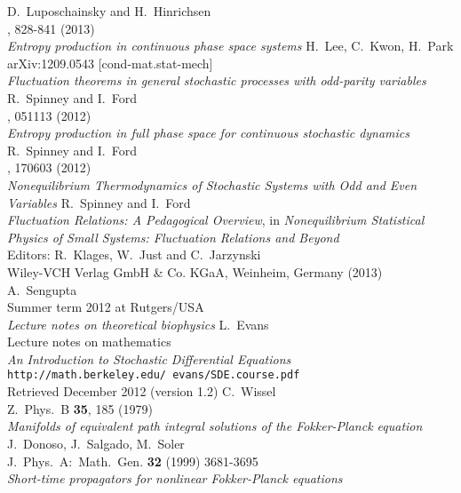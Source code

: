\begin{thebibliography}{99}
		
	 {
		D.~Luposchainsky and H.~Hinrichsen \\
		, 828-841 (2013) \\
		\emph{Entropy production in continuous phase space systems}
		}
	 {
		H.~Lee, C.~Kwon, H.~Park \\
		arXiv:1209.0543 [cond-mat.stat-mech] \\
		\emph{Fluctuation theorems in general stochastic processes with odd-parity variables}
		}
	 {
		R.~Spinney and I.~Ford \\
		, 051113 (2012) \\
		\emph{Entropy production in full phase space for continuous stochastic dynamics}
		}
	 {
		R.~Spinney and I.~Ford \\
		, 170603 (2012) \\
		\emph{Nonequilibrium Thermodynamics of Stochastic Systems with Odd and Even Variables}
		}
	 {
		R.~Spinney and I.~Ford \\
		\emph{Fluctuation Relations: A Pedagogical Overview}, in \emph{Nonequilibrium Statistical Physics of Small Systems: Fluctuation Relations and Beyond} \\
		Editors: R.~Klages, W.~Just and C.~Jarzynski \\
		Wiley-VCH Verlag GmbH \& Co. KGaA, Weinheim, Germany (2013)
		}
	 {
		A.~Sengupta \\
		Summer term 2012 at Rutgers/USA \\
		\emph{Lecture notes on theoretical biophysics}
		}
	 {
		L.~Evans \\
		Lecture notes on mathematics \\
		\emph{An Introduction to Stochastic Differential Equations} \\
		\texttt{http://math.berkeley.edu/~evans/SDE.course.pdf} \\
		Retrieved December 2012 (version 1.2)
		}
	 {
		C.~Wissel \\
		Z.~Phys.~B \textbf{35}, 185 (1979) \\
		\emph{Manifolds of equivalent path integral solutions of the Fokker-Planck equation}
		}
	 {
		J.~Donoso, J.~Salgado, M.~Soler \\
		J.~Phys.~A:~Math.~Gen. \textbf{32} (1999) 3681-3695 \\
		\emph{Short-time propagators for nonlinear Fokker-Planck equations}
		}

\end{thebibliography}